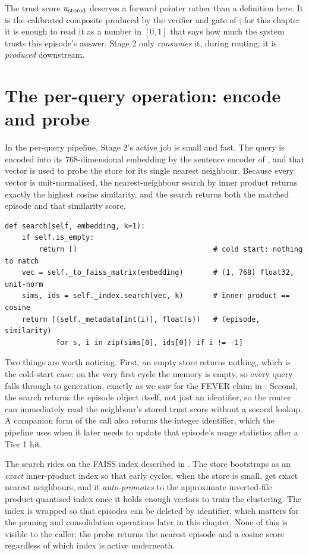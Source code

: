 The trust score $u_{\text{stored}}$ deserves a forward pointer rather than a definition here.
It is the calibrated composite produced by the verifier and gate of
; for this chapter it is enough to read it as a number
in $[0,1]$ that says how much the system trusts this episode's answer. Stage 2 only
\emph{consumes} it, during routing; it is \emph{produced} downstream.

\section{The per-query operation: encode and probe}
\label{sec:memory-probe}

In the per-query pipeline, Stage 2's active job is small and fast. The query is
encoded into its $768$-dimensional embedding by the sentence encoder of
, and that vector is used to probe the store for its
single nearest neighbour. Because every vector is unit-normalised, the
nearest-neighbour search by inner product returns exactly the highest cosine
similarity, and the search returns both the matched episode and that similarity
score.

\begin{lstlisting}[caption={The nearest-neighbour probe, condensed from \texttt{caem/memory/store.py}.}, label={lst:search}]
def search(self, embedding, k=1):
    if self.is_empty:
        return []                                # cold start: nothing to match
    vec = self._to_faiss_matrix(embedding)       # (1, 768) float32, unit-norm
    sims, ids = self._index.search(vec, k)       # inner product == cosine
    return [(self._metadata[int(i)], float(s))   # (episode, similarity)
            for s, i in zip(sims[0], ids[0]) if i != -1]
\end{lstlisting}

Two things are worth noticing. First, an empty store returns nothing, which is the
cold-start case: on the very first cycle the memory is empty, so every query falls
through to generation, exactly as we saw for the FEVER claim in .
Second, the search returns the episode object itself, not just an identifier, so the
router can immediately read the neighbour's stored trust score without a second
lookup. A companion form of the call also returns the integer identifier, which the
pipeline uses when it later needs to update that episode's usage statistics after a
Tier 1 hit.

\begin{fromcode}
The search rides on the FAISS index described in . The store
bootstraps as an \emph{exact} inner-product index so that early cycles, when the
store is small, get exact nearest neighbours, and it \emph{auto-promotes} to the
approximate inverted-file product-quantised index once it holds enough vectors to
train the clustering. The index is wrapped so that episodes can be deleted by
identifier, which matters for the pruning and consolidation operations later in this
chapter. None of this is visible to the caller: the probe returns the nearest
episode and a cosine score regardless of which index is active underneath.
\end{fromcode}

